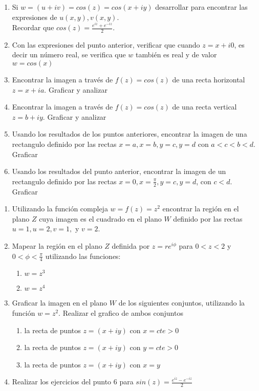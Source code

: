 \documentclass[12pt]{article}
\begin{document}
\begin{enumerate}
\item Si $w = (u+iv) = cos (z) = cos(x+iy)$ desarrollar para encontrar las expresiones de $u(x,y), v(x,y)$.\\ Recordar que  $cos(z) = \frac{e^{iz}+e^{-iz}}{2}$.
\item Con las expresiones del punto anterior, verificar que cuando $z = x +i 0$, es decir un número real, se verifica que $w$ también es real y de valor $w=cos(x)$
\item Encontrar la imagen a través de $f(z)=cos(z)$ de una recta horizontal $z=x+ia$. Graficar y analizar
\item Encontrar la imagen a través de $f(z)=cos(z)$ de una recta vertical $z=b+iy$. Graficar y analizar
\item Usando los resultados de los puntos anteriores, encontrar la imagen de una rectangulo definido por las rectas $x=a, x=b, y=c, y=d$ con $a < c < b < d$. Graficar
\item Usando los resultados del punto anterior, encontrar la imagen de un rectangulo definido por las rectas  $x=0, x=\frac{\pi}{2}, y=c, y=d$, con $c<d$. Graficar
\end{enumerate}

\begin{enumerate}
\item Utilizando la función compleja $w=f(z)=z^2$ encontrar la región en el plano $Z$ cuya imagen es el cuadrado en el plano $W$ definido por las rectas $u=1, u=2, v=1,$ y $v=2$.
\item Mapear la región en el plano $Z$ definida por $z=re^{i\phi}$ para $0<z<2$ y $ 0<\phi< \frac{\pi}{4}$ utilizando las funciones:
\begin{enumerate}
\item $w = z^3$
\item $w = z^4$
\end{enumerate}
\item Graficar la imagen en el plano $W$ de los siguientes conjuntos, utilizando la función $w=z^2$. Realizar el grafico de ambos conjuntos
\begin{enumerate}
\item la recta de puntos $z=(x+iy)$ con $x=cte > 0$
\item la recta de puntos $z=(x+iy)$ con $y=cte > 0$
\item la recta de puntos $z=(x+iy)$ con $x=y$
\end{enumerate}
\item Realizar los ejercicios del punto 6 para  $sin(z) = \frac{e^{iz}-e^{-iz}}{2}$
\end{enumerate}
\end{document}
